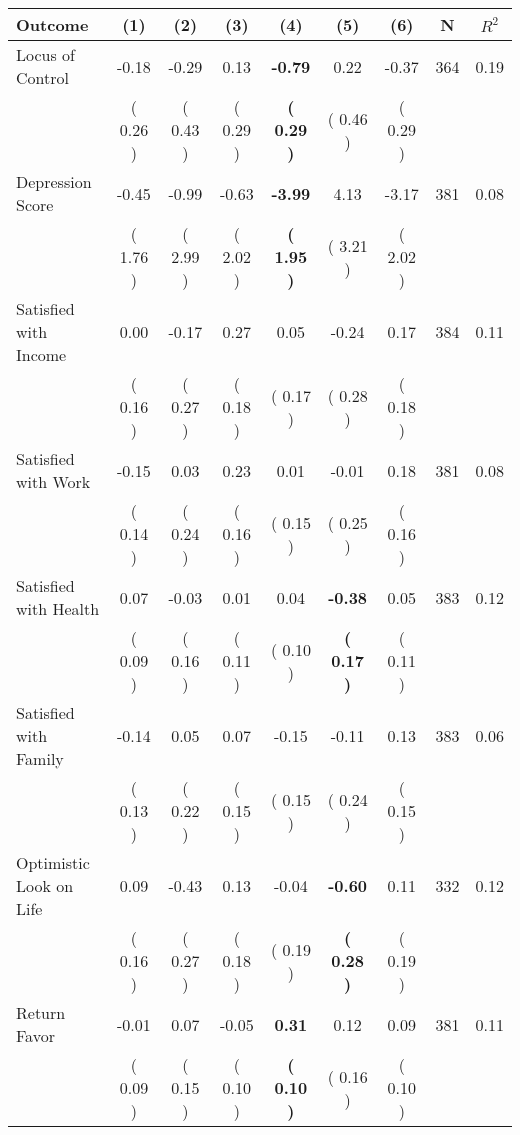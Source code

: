 \begin{tabular}{lcccccccc}
\toprule
 \textbf{Outcome} & \textbf{(1)} & \textbf{(2)} & \textbf{(3)} & \textbf{(4)} & \textbf{(5)} & \textbf{(6)} & \textbf{N} & \textbf{$ R^2$} \\
\midrule
Locus of Control &     -0.18 &     -0.29 &      0.13 & \textbf{    -0.79} &      0.22 &     -0.37 & 364 &       0.19 \\ 
 & (     0.26 ) & (     0.43 ) & (     0.29 ) & \textbf{(     0.29 )} & (     0.46 ) & (     0.29 ) & \\
Depression Score &     -0.45 &     -0.99 &     -0.63 & \textbf{    -3.99} &      4.13 &     -3.17 & 381 &       0.08 \\ 
 & (     1.76 ) & (     2.99 ) & (     2.02 ) & \textbf{(     1.95 )} & (     3.21 ) & (     2.02 ) & \\
Satisfied with Income &      0.00 &     -0.17 &      0.27 &      0.05 &     -0.24 &      0.17 & 384 &       0.11 \\ 
 & (     0.16 ) & (     0.27 ) & (     0.18 ) & (     0.17 ) & (     0.28 ) & (     0.18 ) & \\
Satisfied with Work &     -0.15 &      0.03 &      0.23 &      0.01 &     -0.01 &      0.18 & 381 &       0.08 \\ 
 & (     0.14 ) & (     0.24 ) & (     0.16 ) & (     0.15 ) & (     0.25 ) & (     0.16 ) & \\
Satisfied with Health &      0.07 &     -0.03 &      0.01 &      0.04 & \textbf{    -0.38} &      0.05 & 383 &       0.12 \\ 
 & (     0.09 ) & (     0.16 ) & (     0.11 ) & (     0.10 ) & \textbf{(     0.17 )} & (     0.11 ) & \\
Satisfied with Family &     -0.14 &      0.05 &      0.07 &     -0.15 &     -0.11 &      0.13 & 383 &       0.06 \\ 
 & (     0.13 ) & (     0.22 ) & (     0.15 ) & (     0.15 ) & (     0.24 ) & (     0.15 ) & \\
Optimistic Look on Life &      0.09 &     -0.43 &      0.13 &     -0.04 & \textbf{    -0.60} &      0.11 & 332 &       0.12 \\ 
 & (     0.16 ) & (     0.27 ) & (     0.18 ) & (     0.19 ) & \textbf{(     0.28 )} & (     0.19 ) & \\
Return Favor &     -0.01 &      0.07 &     -0.05 & \textbf{     0.31} &      0.12 &      0.09 & 381 &       0.11 \\ 
 & (     0.09 ) & (     0.15 ) & (     0.10 ) & \textbf{(     0.10 )} & (     0.16 ) & (     0.10 ) & \\

\end{tabular}
